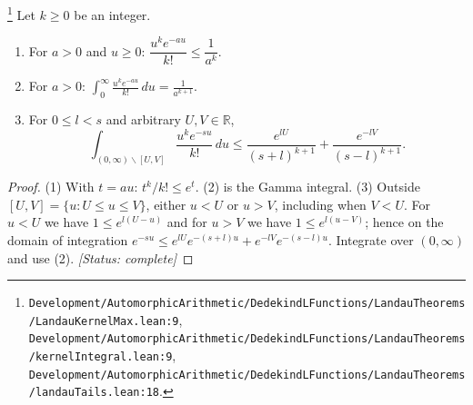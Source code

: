 \begin{lemma}\label{lem:E-kernel}
\footnote{\nolinkurl{Development/AutomorphicArithmetic/DedekindLFunctions/LandauTheorems/LandauKernelMax.lean:9}, \nolinkurl{Development/AutomorphicArithmetic/DedekindLFunctions/LandauTheorems/kernelIntegral.lean:9}, \nolinkurl{Development/AutomorphicArithmetic/DedekindLFunctions/LandauTheorems/landauTails.lean:18}.}%
Let $k\ge0$ be an integer.
\begin{enumerate}
\item For $a>0$ and $u\ge0$: $\dfrac{u^{k}e^{-au}}{k!}\le\dfrac1{a^{k}}$.
\item For $a>0$: $\displaystyle\int_0^\infty\frac{u^{k}e^{-au}}{k!}\,du=\frac1{a^{k+1}}$.
\item For $0\le l<s$ and arbitrary $U,V\in\mathbb R$,
\[
\int_{(0,\infty)\smallsetminus[U,V]}\frac{u^{k}e^{-su}}{k!}\,du\le
\frac{e^{lU}}{(s+l)^{k+1}}+\frac{e^{-lV}}{(s-l)^{k+1}} .
\]
\end{enumerate}
\end{lemma}
\begin{proof}
(1) With $t=au$: $t^{k}/k!\le e^{t}$. (2) is the Gamma integral. (3) Outside $[U,V]=\{u:U\le u\le V\}$, either $u<U$ or $u>V$, including when $V<U$. For $u<U$ we have
$1\le e^{l(U-u)}$ and for $u>V$ we have $1\le e^{l(u-V)}$; hence on the domain of integration
$e^{-su}\le e^{lU}e^{-(s+l)u}+e^{-lV}e^{-(s-l)u}$. Integrate over $(0,\infty)$ and use (2).
\textit{[Status: complete]}
\end{proof}

